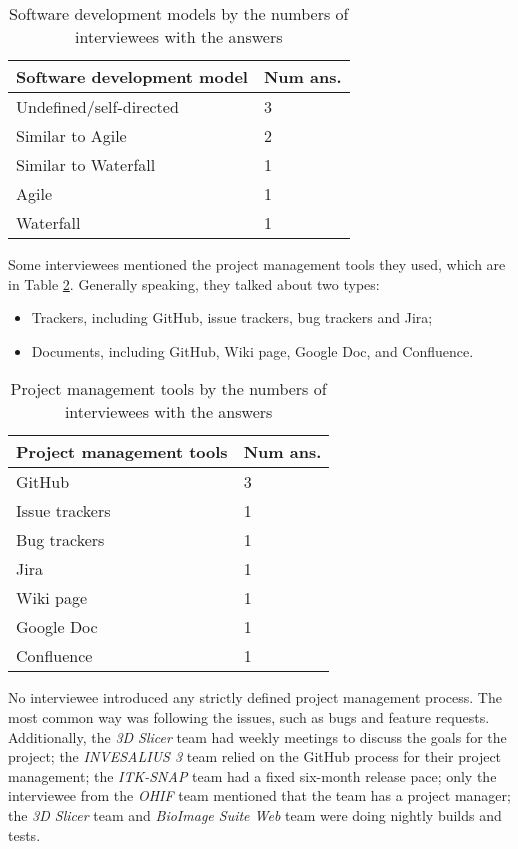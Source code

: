 \begin{table}[H]
\centering
\begin{tabular}{ll}
\hline
Software development model & Num ans. \\ \hline
Undefined/self-directed & 3 \\
Similar to Agile & 2 \\
Similar to Waterfall & 1 \\
Agile & 1 \\
Waterfall & 1 \\ \hline
\end{tabular}
\caption{\label{tab_developmen_models}Software development models by the numbers of interviewees with the answers}
\end{table}

Some interviewees mentioned the project management tools they used, which are in Table \ref{tab_pm_tools}. Generally speaking, they talked about two types:

\begin{itemize}
\item Trackers, including GitHub, issue trackers, bug trackers and Jira;
\item Documents, including GitHub, Wiki page, Google Doc, and Confluence.
\end{itemize}

\begin{table}[H]
\centering
\begin{tabular}{ll}
\hline
Project management tools & Num ans. \\ \hline
GitHub & 3 \\
Issue trackers & 1 \\
Bug trackers & 1 \\
Jira & 1 \\
Wiki page & 1 \\
Google Doc & 1 \\
Confluence & 1 \\ \hline
\end{tabular}
\caption{\label{tab_pm_tools}Project management tools by the numbers of interviewees with the answers}
\end{table}

No interviewee introduced any strictly defined project management process. The most common way was following the issues, such as bugs and feature requests. Additionally, the \textit{3D Slicer} team had weekly meetings to discuss the goals for the project; the \textit{INVESALIUS 3} team relied on the GitHub process for their project management; the \textit{ITK-SNAP} team had a fixed six-month release pace; only the interviewee from the \textit{OHIF} team mentioned that the team has a project manager; the \textit{3D Slicer} team and \textit{BioImage Suite Web} team were doing nightly builds and tests.

